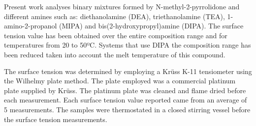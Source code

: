 Present work analyses binary mixtures formed by N-methyl-2-pyrrolidone
and different amines such as: diethanolamine (DEA), triethanolamine (TEA),
1-amino-2-propanol (MIPA) and bis(2-hydroxypropyl)amine (DIPA). The surface
tension value has been obtained over the entire composition range and for
temperatures from 20 to 50ºC. Systems that use DIPA the composition range has
been reduced taken into account the melt temperature of this compound.

The surface tension was determined by employing a Krüss K-11 tensiometer
using the Wilhelmy plate method. The plate employed was a commercial platinum
plate supplied by Krüss. The platinum plate was cleaned and flame dried before each
measurement. Each surface tension value reported came from an average of 5
measurements. The samples were thermostated in a closed stirring vessel before the
surface tension measurements.

